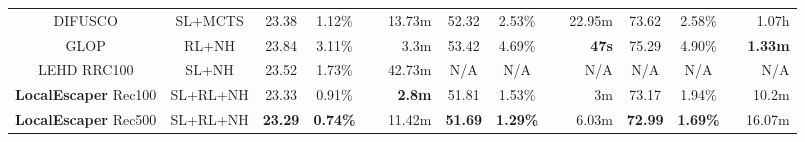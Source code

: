 \begin{table*}[ht]
{\begin{tabular}{cc|ccr|ccr|ccr}
DIFUSCO &SL+MCTS &23.38 &1.12\% &13.73m &52.32 &2.53\% &22.95m  &73.62 &2.58\% &~~1.07h \\

GLOP &RL+NH &23.84 &3.11\% &~~~~3.3m  &53.42 &4.69\% &~~~~\textbf{47s}  &75.29 &4.90\% &~~\textbf{1.33m} \\

LEHD RRC100 &SL+NH &23.52 &1.73\% &42.73m  &N/A &N/A &N/A  &N/A &N/A &N/A \\

\textbf{LocalEscaper} Rec100 &SL+RL+NH &23.33 &0.91\% &~~~~\textbf{2.8m}  &51.81 &1.53\% &~~~~~~3m  &73.17 &1.94\% &~~10.2m \\

\textbf{LocalEscaper} Rec500 &SL+RL+NH &\textbf{23.29} &\textbf{0.74\%} &11.42m  &\textbf{51.69} &\textbf{1.29\%} &~~6.03m  &\textbf{72.99} &\textbf{1.69\%} &16.07m \\
\bottomrule%
\end{tabular}
}
\end{table*}